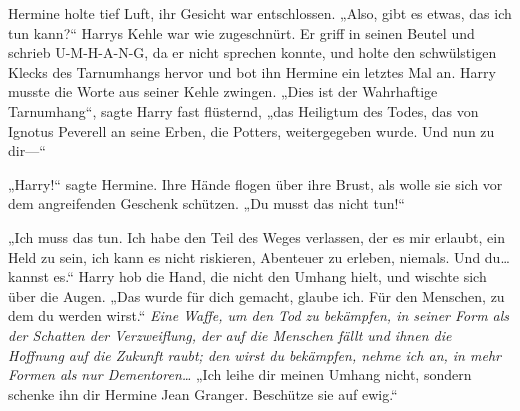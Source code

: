 Hermine holte tief Luft, ihr Gesicht war entschlossen.
„Also, gibt es etwas, das ich tun kann?“
Harrys Kehle war wie zugeschnürt. Er griff in seinen Beutel und schrieb U-M-H-A-N-G, da er nicht sprechen konnte, und holte den schwülstigen Klecks des Tarnumhangs hervor und bot ihn Hermine ein letztes Mal an. Harry musste die Worte aus seiner Kehle zwingen.
„Dies ist der Wahrhaftige Tarnumhang“, sagte Harry fast flüsternd, „das Heiligtum des Todes, das von Ignotus Peverell an seine Erben, die Potters, weitergegeben wurde. Und nun zu dir—“

„Harry!“ sagte Hermine. Ihre Hände flogen über ihre Brust, als wolle sie sich vor dem angreifenden Geschenk schützen.
„Du musst das nicht tun!“

„Ich muss das tun. Ich habe den Teil des Weges verlassen, der es mir erlaubt, ein Held zu sein, ich kann es nicht riskieren, Abenteuer zu erleben, niemals. Und du…kannst es.“ Harry hob die Hand, die nicht den Umhang hielt, und wischte sich über die Augen. „Das wurde für dich gemacht, glaube ich. Für den Menschen, zu dem du werden wirst.“
\emph{Eine Waffe, um den Tod zu bekämpfen, in seiner Form als der Schatten der Verzweiflung, der auf die Menschen fällt und ihnen die Hoffnung auf die Zukunft raubt; den wirst du bekämpfen, nehme ich an, in mehr Formen als nur Dementoren…}
„Ich leihe dir meinen Umhang nicht, sondern schenke ihn dir Hermine Jean Granger. Beschütze sie auf ewig.“


